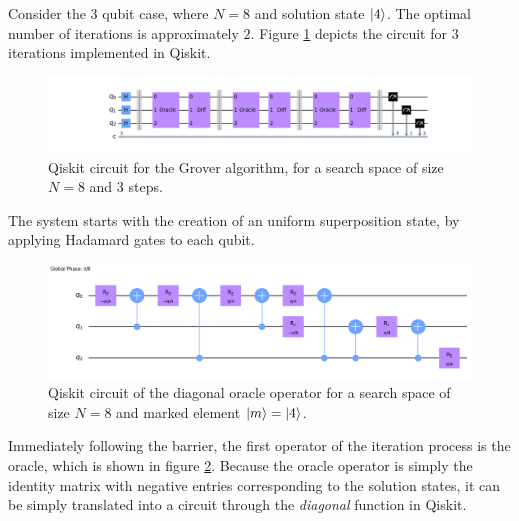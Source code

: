\documentclass[../../dissertation.tex]{subfiles}
\begin{document}
Consider the $3$ qubit case, where $N=8$ and solution state $\ket{4}$. The
optimal number of iterations is approximately $2$. Figure
\ref{fig:groverCircuitQistkit} depicts the circuit for $3$ iterations implemented in
Qiskit.
\begin{figure}[!h]
	\centering
	\includegraphics[scale=0.30]{img/Qiskit/GroverQiskit/Circuits/GroverQiskitCirc_N3_M4_S3.png}
	\caption{Qiskit circuit for the Grover algorithm, for a search space of size $N=8$ and $3$ steps.}
	\label{fig:groverCircuitQistkit}
\end{figure}\par
The system starts with the creation of an uniform superposition state, by applying Hadamard gates to each qubit.  
\begin{figure}[!h]
	\centering
	\includegraphics[scale=0.25]{img/Qiskit/GroverQiskit/Circuits/GroverQiskitCircOracle_N3_M4_S3.png}
	\caption{Qiskit circuit of the  diagonal oracle operator for a search space of size $N=8$ and marked element $\ket{m}=\ket{4}$.}
	\label{fig:groverOracleCircuitQistkit}
\end{figure}
Immediately following the barrier, the first operator of the iteration process
is the oracle, which is shown in figure \ref{fig:groverOracleCircuitQistkit}.
Because the oracle operator is simply the identity matrix with negative entries
corresponding to the solution states, it can be simply translated into a
circuit through the \textit{diagonal} function in Qiskit.\par
\end{document}
